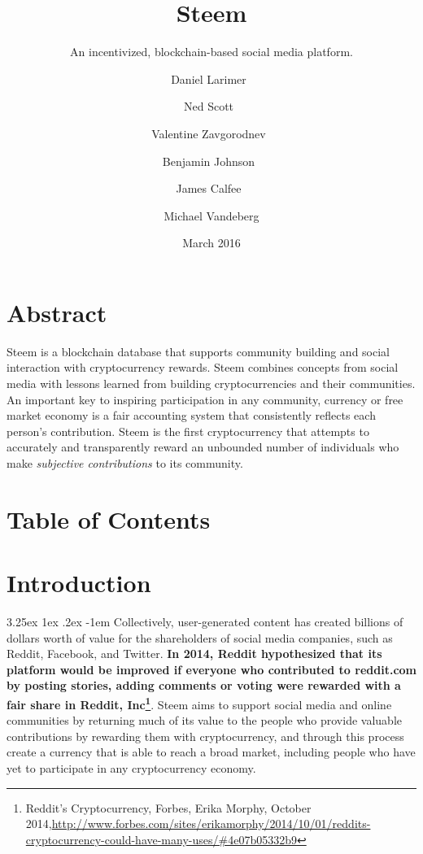 \documentclass{article}
\title{Steem}
\subtitle{An incentivized, blockchain-based social media platform.}
\date{March 2016}
\author{
    Daniel Larimer\
    \and
    Ned Scott\
    \and
    Valentine Zavgorodnev\
    \and
    Benjamin Johnson\
    \and
    James Calfee\
    \and
    Michael Vandeberg
    }
\makeatletter
\renewcommand\paragraph{\@startsection{paragraph}{5}{\z@}%
  {3.25ex \@plus1ex \@minus.2ex}%
  {-1em}%
  {\normalfont\normalsize\bfseries}}
\makeatother
\begin{document}
    \renewcommand \thesection{\roman{section}}

    \maketitle

    \newpage

    \section{Abstract}

        Steem is a blockchain database that supports community building and social interaction with cryptocurrency rewards. Steem combines concepts from social media with lessons learned from building cryptocurrencies and their communities. An important key to inspiring participation in any community, currency or free market economy is a fair accounting system that consistently reflects each person's contribution. Steem is the first cryptocurrency that attempts to accurately and transparently reward an unbounded number of individuals who make \textit{subjective contributions} to its community.

    \newpage

    \section{Table of Contents}

    \tableofcontents

    \newpage

    \setcounter{section}{0}

    \renewcommand \thesection{\arabic{section}}

    \section{Introduction}

        \paragraph{}
            Collectively, user-generated content has created billions of dollars worth of value for the shareholders of social media companies, such as Reddit, Facebook, and Twitter. \textbf{In 2014, Reddit hypothesized that its platform would be improved if everyone who contributed to reddit.com by posting stories, adding comments or voting were rewarded with a fair share in Reddit, Inc\footnote{Reddit's Cryptocurrency, Forbes, Erika Morphy, October 2014,\newline\url{http://www.forbes.com/sites/erikamorphy/2014/10/01/reddits-cryptocurrency-could-have-many-uses/\#4e07b05332b9}}}. Steem aims to support social media and online communities by returning much of its value to the people who provide valuable contributions by rewarding them with cryptocurrency, and through this process create a currency that is able to reach a broad market, including people who have yet to participate in any cryptocurrency economy.
\end{document}
